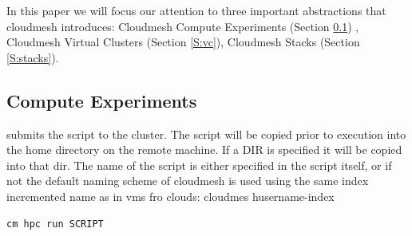 In this paper we will focus our attention to three important
abstractions that cloudmesh introduces: Cloudmesh Compute Experiments
(Section \ref{S:experiments}) , Cloudmesh Virtual Clusters (Section
\ref{S:vc}), Cloudmesh Stacks (Section \ref{S:stacks}).

\subsection{Compute Experiments} \label{S:experiments}

submits the script to the cluster. The script will be copied prior to
execution into the home directory on the remote machine. If a DIR is
specified it will be copied into that dir.  The name of the script is
either specified in the script itself, or if not the default naming
scheme of cloudmesh is used using the same index incremented name as
in vms fro clouds: cloudmes husername-index

\begin{verbatim}
cm hpc run SCRIPT
\end{verbatim}

